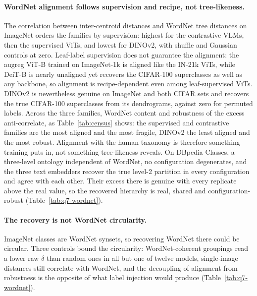 \documentclass{article}
\begin{document}
\paragraph{WordNet alignment follows supervision and recipe, not tree-likeness.} The correlation between inter-centroid distances and WordNet tree distances on ImageNet orders the families by supervision: highest for the contrastive VLMs, then the supervised ViTs, and lowest for DINOv2, with shuffle and Gaussian controls at zero. Leaf-label supervision does not guarantee the alignment: the augreg ViT-B trained on ImageNet-1k is aligned like the IN-21k ViTs, while DeiT-B is nearly unaligned yet recovers the CIFAR-100 superclasses as well as any backbone, so alignment is recipe-dependent even among leaf-supervised ViTs. DINOv2 is nevertheless genuine on ImageNet and both CIFAR sets and recovers the true CIFAR-100 superclasses from its dendrograms, against zero for permuted labels. Across the three families, WordNet content and robustness of the excess anti-correlate, as Table~\ref{tab:census} shows: the supervised and contrastive families are the most aligned and the most fragile, DINOv2 the least aligned and the most robust. Alignment with the human taxonomy is therefore something training puts in, not something tree-likeness reveals. On DBpedia Classes, a three-level ontology independent of WordNet, no configuration degenerates, and the three text embedders recover the true level-2 partition in every configuration and agree with each other. Their excess there is genuine with every replicate above the real value, so the recovered hierarchy is real, shared and configuration-robust (Table~\ref{tab:q7-wordnet}). %

\paragraph{The recovery is not WordNet circularity.} ImageNet classes are WordNet synsets, so recovering WordNet there could be circular. Three controls bound the circularity: WordNet-coherent groupings read a lower raw $\delta$ than random ones in all but one of twelve models, single-image distances still correlate with WordNet, and the decoupling of alignment from robustness is the opposite of what label injection would produce (Table~\ref{tab:q7-wordnet}). %
\end{document}
